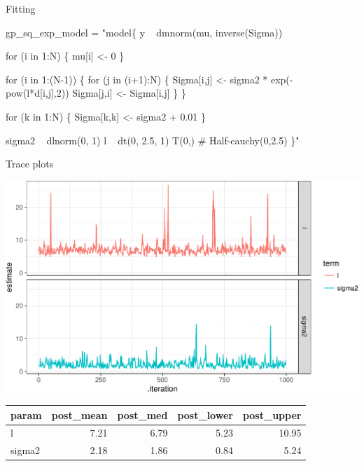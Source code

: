 \documentclass[11pt,ignorenonframetext,]{beamer}
\newenvironment{Shaded}{}{}
\newcommand{\NormalTok}[1]{#1}
\newcommand{\StringTok}[1]{\textcolor[rgb]{0.25,0.44,0.63}{#1}}
\let\oldShaded\Shaded
\let\endoldShaded\endShaded
\renewenvironment{Shaded}{\footnotesize\begin{spacing}{0.9}\oldShaded}{\endoldShaded\end{spacing}}
\begin{document}
\begin{frame}[fragile]{%
\protect\hypertarget{fitting}{%
Fitting}}

\begin{Shaded}
\begin{Highlighting}[]
\NormalTok{gp_sq_exp_model =}\StringTok{ "model\{}
\StringTok{  y ~ dmnorm(mu, inverse(Sigma))}

\StringTok{  for (i in 1:N) \{}
\StringTok{    mu[i] <- 0}
\StringTok{  \}}

\StringTok{  for (i in 1:(N-1)) \{}
\StringTok{    for (j in (i+1):N) \{}
\StringTok{      Sigma[i,j] <- sigma2 * exp(- pow(l*d[i,j],2))}
\StringTok{      Sigma[j,i] <- Sigma[i,j]}
\StringTok{    \}}
\StringTok{  \}}

\StringTok{  for (k in 1:N) \{}
\StringTok{    Sigma[k,k] <- sigma2 + 0.01}
\StringTok{  \}}

\StringTok{  sigma2   ~ dlnorm(0, 1)}
\StringTok{  l        ~ dt(0, 2.5, 1) T(0,) # Half-cauchy(0,2.5)}
\StringTok{\}"}
\end{Highlighting}
\end{Shaded}

\end{frame}

\begin{frame}{%
\protect\hypertarget{trace-plots}{%
Trace plots}}

\begin{center}\includegraphics[width=\textwidth]{Lec12_files/figure-beamer/unnamed-chunk-18-1} \end{center}

\footnotesize

\begin{longtable}[]{@{}lrrrr@{}}
\toprule
param & post\_mean & post\_med & post\_lower &
post\_upper\tabularnewline
\midrule
\endhead
l & 7.21 & 6.79 & 5.23 & 10.95\tabularnewline
sigma2 & 2.18 & 1.86 & 0.84 & 5.24\tabularnewline
\bottomrule
\end{longtable}

\end{frame}
\end{document}
